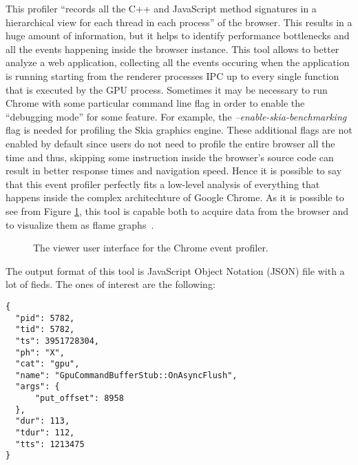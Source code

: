 This profiler ``records all the C++ and JavaScript method signatures in a
hierarchical view for each thread in each process'' of the browser. This results
in a huge amount of information, but it helps to identify performance bottlenecks
and all the events happening inside the browser instance. This tool allows to
better analyze a web application, collecting all the events occuring when the
application is running starting from the renderer processes IPC up to every single
function that is executed by the GPU process. Sometimes it may be necessary
to run Chrome with some particular command line flag in order to enable the
``debugging mode'' for some feature. For example, the \emph{--enable-skia-benchmarking}
flag is needed for profiling the Skia graphics engine. These additional flags
are not enabled by default since users do not need to profile the entire browser
all the time and thus, skipping some instruction inside the browser's source code
can result in better response times and navigation speed. Hence it is possible
to say that this event profiler perfectly fits a low-level analysis of everything
that happens inside the complex architechture of Google Chrome.
As it is possible to see from Figure \ref{img:chrome_event_profiler}, this tool
is capable both to acquire data from the browser and to visualize them as flame
graphs~\cite{gregg2016flame}.
\begin{figure}[!htb]
    \caption{The viewer user interface for the Chrome event profiler.}
    \label{img:chrome_event_profiler}
\end{figure}

The output format of this tool is JavaScript Object Notation (JSON) file with a
lot of fieds. The ones of interest are the following:
\begin{lstlisting}
{
  "pid": 5782,
  "tid": 5782,
  "ts": 3951728304,
  "ph": "X",
  "cat": "gpu",
  "name": "GpuCommandBufferStub::OnAsyncFlush",
  "args": {
      "put_offset": 8958
  },
  "dur": 113,
  "tdur": 112,
  "tts": 1213475
}
\end{lstlisting}

